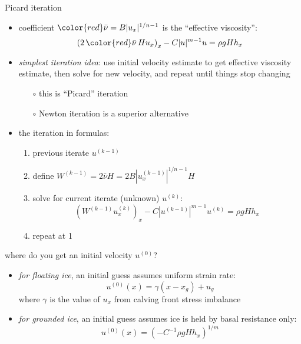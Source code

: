 \begin{frame}{Picard iteration}

\begin{itemize}
\item coefficient ${\color{red} \bar \nu} = B |u_x|^{1/n-1}$ is the ``effective viscosity'':
   $$\left(2 \,{\color{red} \bar \nu}\, H u_x\right)_x - C |u|^{m-1} u = \rho g H h_x$$
\item \emph{simplest iteration idea}: use initial velocity estimate to get effective viscosity estimate, then solve for new velocity, and repeat until things stop changing
  \begin{itemize}
  \item[$\circ$] this is ``Picard'' iteration
  \item[$\circ$] Newton iteration is a superior alternative
  \end{itemize}
\item the iteration in formulas:
  \begin{enumerate}
  \item previous iterate $u^{(k-1)}$
  \item define $W^{(k-1)} = 2 \bar \nu H = 2 B |u^{(k-1)}_x|^{1/n-1} H$
  \item solve for current iterate (unknown) $u^{(k)}$:
     $$\left(W^{(k-1)} u^{(k)}_x\right)_x - C |u^{(k-1)}|^{m-1} u^{(k)} = \rho g H h_x$$
  \item repeat at 1
  \end{enumerate}
\end{itemize}
\end{frame}


\begin{frame}{where do you get an initial velocity $u^{(0)}$?}

\begin{itemize}
\item \emph{for floating ice}, an initial guess assumes uniform strain rate:
   $$u^{(0)}(x) = \gamma (x-x_g) + u_g$$
where $\gamma$ is the value of $u_x$ from calving front stress imbalance
\item \emph{for grounded ice}, an initial guess assumes ice is held by basal resistance only:
   $$u^{(0)}(x) = \left(-C^{-1} \rho g H h_x\right)^{1/m}$$
\end{itemize}
\end{frame}


